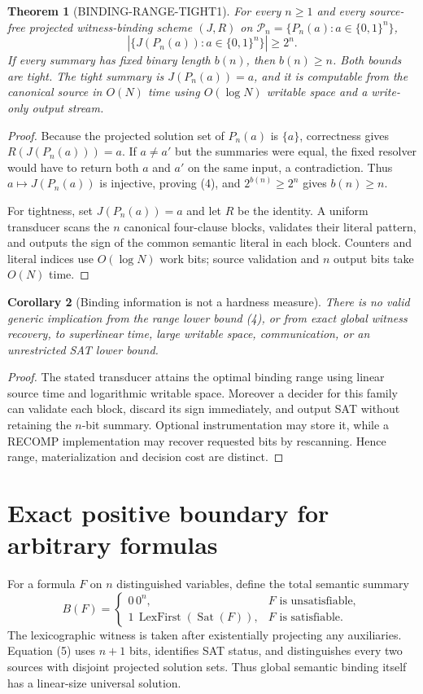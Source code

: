 \documentclass[11pt]{article}
\newtheorem{theorem}{Theorem}
\newtheorem{corollary}[theorem]{Corollary}
\begin{document}
\begin{theorem}[BINDING-RANGE-TIGHT1]
For every $n\ge1$ and every source-free projected witness-binding scheme
$(J,R)$ on $\mathcal P_n=\{P_n(a):a\in\{0,1\}^n\}$,
\[
 |\{J(P_n(a)):a\in\{0,1\}^n\}|\ge2^n.                                  \tag{4}
\]
If every summary has fixed binary length $b(n)$, then $b(n)\ge n$.
Both bounds are tight.  The tight summary is $J(P_n(a))=a$, and it is
computable from the canonical source in $O(N)$ time using $O(\log N)$
writable space and a write-only output stream.
\end{theorem}
\begin{proof}
Because the projected solution set of $P_n(a)$ is $\{a\}$, correctness gives
$R(J(P_n(a)))=a$.  If $a\ne a'$ but the summaries were equal, the fixed
resolver would have to return both $a$ and $a'$ on the same input, a
contradiction.  Thus $a\mapsto J(P_n(a))$ is injective, proving (4), and
$2^{b(n)}\ge2^n$ gives $b(n)\ge n$.

For tightness, set $J(P_n(a))=a$ and let $R$ be the identity.  A uniform
transducer scans the $n$ canonical four-clause blocks, validates their
literal pattern, and outputs the sign of the common semantic literal in each
block.  Counters and literal indices use $O(\log N)$ work bits; source
validation and $n$ output bits take $O(N)$ time.
\end{proof}

\begin{corollary}[Binding information is not a hardness measure]
There is no valid generic implication from the range lower bound (4), or
from exact global witness recovery, to superlinear time, large writable
space, communication, or an unrestricted SAT lower bound.
\end{corollary}
\begin{proof}
The stated transducer attains the optimal binding range using linear source
time and logarithmic writable space.  Moreover a decider for this family can
validate each block, discard its sign immediately, and output SAT without
retaining the $n$-bit summary.  Optional instrumentation may store it, while
a RECOMP implementation may recover requested bits by rescanning.  Hence
range, materialization and decision cost are distinct.
\end{proof}

\section{Exact positive boundary for arbitrary formulas}
For a formula $F$ on $n$ distinguished variables, define the total semantic
summary
\[
B(F)=
\begin{cases}
0\,0^n,&F\text{ is unsatisfiable},\\
1\,\operatorname{LexFirst}(\operatorname{Sat}(F)),&F\text{ is satisfiable}.
\end{cases}                                                               \tag{5}
\]
The lexicographic witness is taken after existentially projecting any
auxiliaries.  Equation (5) uses $n+1$ bits, identifies SAT status, and
distinguishes every two sources with disjoint projected solution sets.
Thus global semantic binding itself has a linear-size universal solution.
\end{document}
